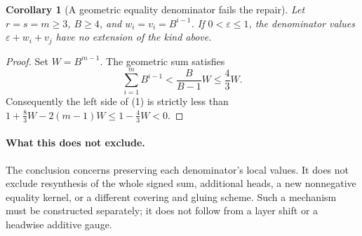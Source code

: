 \documentclass[11pt]{article}
\newtheorem{corollary}{Corollary}
\begin{document}
\begin{corollary}[A geometric equality denominator fails the repair]
Let $r=s=m\geq3$, $B\geq4$, and $w_i=v_i=B^{i-1}$.
If $0<\varepsilon\leq1$, the denominator values
$\varepsilon+w_i+v_j$ have no extension of the kind above.
\end{corollary}
\begin{proof}
Set $W=B^{m-1}$. The geometric sum satisfies
\[
 \sum_{i=1}^mB^{i-1}<\frac{B}{B-1}W\leq\frac43W.
\]
Consequently the left side of (1) is strictly less than
$1+\frac83W-2(m-1)W\leq1-\frac43W<0$.
\end{proof}

\paragraph{What this does not exclude.}
The conclusion concerns preserving each denominator's local values.
It does not exclude resynthesis of the whole signed sum, additional
heads, a new nonnegative equality kernel, or a different covering and
gluing scheme. Such a mechanism must be constructed separately; it
does not follow from a layer shift or a headwise additive gauge.
\end{document}
